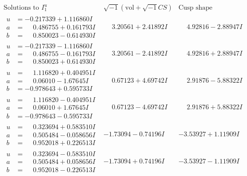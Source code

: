 \documentclass[1p]{elsarticle_modified}
\theoremstyle{definition}
\newcommand{\I}{\sqrt{-1}}
\begin{document}
$$\begin{array}{c|c|c}  
\text{Solutions to }I^u_{1}& \I (\text{vol} + \sqrt{-1}CS) & \text{Cusp shape}\\
 \hline 
\begin{aligned}
u &= -0.217339 + 1.116860 I \\
a &= \phantom{-}0.486755 + 0.161793 I \\
b &= \phantom{-}0.850023 - 0.614930 I\end{aligned}
 & \phantom{-}3.20561 + 2.41892 I & \phantom{-}4.92816 - 2.88947 I \\ \hline\begin{aligned}
u &= -0.217339 - 1.116860 I \\
a &= \phantom{-}0.486755 - 0.161793 I \\
b &= \phantom{-}0.850023 + 0.614930 I\end{aligned}
 & \phantom{-}3.20561 - 2.41892 I & \phantom{-}4.92816 + 2.88947 I \\ \hline\begin{aligned}
u &= \phantom{-}1.116820 + 0.404951 I \\
a &= \phantom{-}0.06010 - 1.67645 I \\
b &= -0.978643 + 0.595733 I\end{aligned}
 & \phantom{-}0.67123 + 4.69742 I & \phantom{-}2.91876 - 5.88322 I \\ \hline\begin{aligned}
u &= \phantom{-}1.116820 - 0.404951 I \\
a &= \phantom{-}0.06010 + 1.67645 I \\
b &= -0.978643 - 0.595733 I\end{aligned}
 & \phantom{-}0.67123 - 4.69742 I & \phantom{-}2.91876 + 5.88322 I \\ \hline\begin{aligned}
u &= \phantom{-}0.323694 + 0.583510 I \\
a &= \phantom{-}0.505484 - 0.058656 I \\
b &= \phantom{-}0.952018 + 0.226513 I\end{aligned}
 & -1.73094 - 0.74196 I & -3.53927 + 1.11909 I \\ \hline\begin{aligned}
u &= \phantom{-}0.323694 - 0.583510 I \\
a &= \phantom{-}0.505484 + 0.058656 I \\
b &= \phantom{-}0.952018 - 0.226513 I\end{aligned}
 & -1.73094 + 0.74196 I & -3.53927 - 1.11909 I \\ \hline\begin{aligned}

\end{aligned}
\end{array}$$
\end{document}
